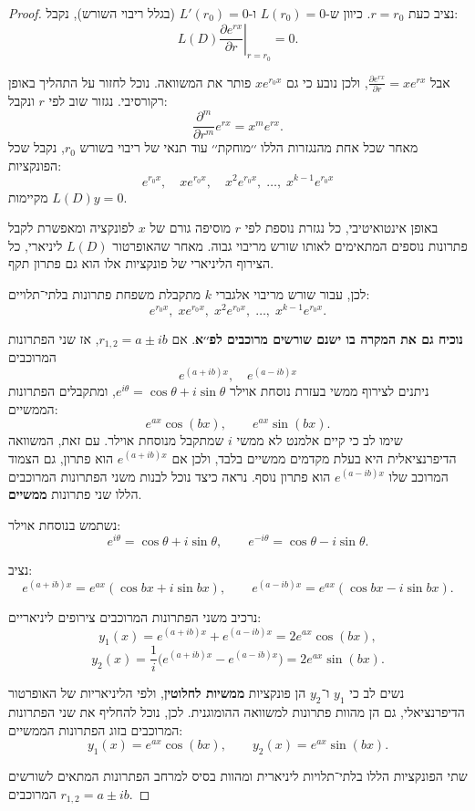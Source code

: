 \documentclass{article}
\numberwithin{equation}{section}
\begin{document}
\begin{proof}
נציב כעת $r=r_0$.  
כיוון ש-$L(r_0)=0$ ו-$L'(r_0)=0$ (בגלל ריבוי השורש), נקבל:
\[
L(D)\left.\frac{\partial e^{rx}}{\partial r}\right|_{r=r_0} = 0.
\]

אבל $\frac{\partial e^{rx}}{\partial r} = x e^{rx}$, ולכן נובע כי גם $x e^{r_0 x}$ פותר את המשוואה.
נוכל לחזור על התהליך באופן רקורסיבי.  
נגזור שוב לפי $r$ ונקבל:
\[
\frac{\partial^m}{\partial r^m} e^{rx} = x^m e^{rx}.
\]
מאחר שכל אחת מהנגזרות הללו ׳׳מוחקת׳׳ עוד תנאי של ריבוי בשורש $r_0$, נקבל שכל הפונקציות:
\[
e^{r_0 x}, \quad x e^{r_0 x}, \quad x^2 e^{r_0 x}, \; \dots, \; x^{k-1} e^{r_0 x}
\]
מקיימות $L(D)y=0$.

באופן אינטואיטיבי, כל נגזרת נוספת לפי $r$ מוסיפה גורם של $x$ לפונקציה ומאפשרת לקבל פתרונות נוספים המתאימים לאותו שורש מריבוי גבוה.  
מאחר שהאופרטור $L(D)$ ליניארי, כל הצירוף הליניארי של פונקציות אלו הוא גם פתרון תקף.

לכן, עבור שורש מריבוי אלגברי $k$ מתקבלת משפחת פתרונות בלתי־תלויים:
\[
\boxed{e^{r_0 x},\; x e^{r_0 x},\; x^2 e^{r_0 x},\; \dots,\; x^{k-1} e^{r_0 x}.}
\]

\textbf{
נוכיח גם את המקרה בו ישנם שורשים מרוכבים לפ׳׳א}.  
אם $r_{1,2}=a\pm ib$, אז שני הפתרונות המרוכבים
\[
e^{(a+ib)x}, \quad e^{(a-ib)x}
\]
ניתנים לצירוף ממשי בעזרת נוסחת אוילר $e^{i\theta}=\cos\theta+i\sin\theta$, ומתקבלים הפתרונות הממשיים:
\[
e^{ax}\cos(bx), \qquad e^{ax}\sin(bx).
\]
שימו לב כי קיים אלמנט לא ממשי $i$ שמתקבל מנוסחת אוילר. עם זאת, 
המשוואה הדיפרנציאלית היא בעלת מקדמים ממשיים בלבד, ולכן אם $e^{(a+ib)x}$ הוא פתרון, גם הצמוד המרוכב שלו $e^{(a-ib)x}$ הוא פתרון נוסף.
נראה כיצד נוכל לבנות משני הפתרונות המרוכבים הללו שני פתרונות \textbf{ממשיים}.

נשתמש בנוסחת אוילר:
\[
e^{i\theta} = \cos\theta + i\sin\theta, \qquad e^{-i\theta} = \cos\theta - i\sin\theta.
\]

נציב:
\[
e^{(a+ib)x} = e^{ax}(\cos bx + i\sin bx), \qquad
e^{(a-ib)x} = e^{ax}(\cos bx - i\sin bx).
\]

נרכיב משני הפתרונות המרוכבים צירופים ליניאריים:
\[
y_1(x) = e^{(a+ib)x} + e^{(a-ib)x} = 2 e^{ax}\cos(bx),
\]
\[
y_2(x) = \frac{1}{i}\big(e^{(a+ib)x} - e^{(a-ib)x}\big) = 2 e^{ax}\sin(bx).
\]

נשים לב כי $y_1$ ו־$y_2$ הן פונקציות \textbf{ממשיות לחלוטין}, ולפי הליניאריות של האופרטור הדיפרנציאלי, גם הן מהוות פתרונות למשוואה ההומוגנית.
לכן, נוכל להחליף את שני הפתרונות המרוכבים בזוג הפתרונות הממשיים:
\[
\boxed{
y_1(x) = e^{ax}\cos(bx), \qquad y_2(x) = e^{ax}\sin(bx).
}
\]

שתי הפונקציות הללו בלתי־תלויות ליניארית ומהוות בסיס למרחב הפתרונות המתאים לשורשים המרוכבים $r_{1,2} = a \pm ib$.

\end{proof}
\end{document}
